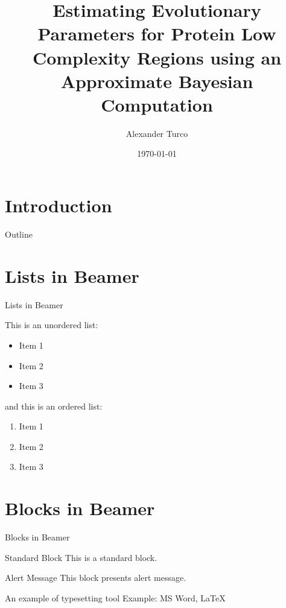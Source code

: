 \documentclass{beamer}
\title[BEAP Dec 2022]{Estimating Evolutionary Parameters for Protein Low Complexity Regions using an Approximate Bayesian Computation}
\author{Alexander Turco}
\date{\today}
\begin{document}
	
	\section{Introduction}
	\begin{frame}
		\titlepage 
	\end{frame}

	
	\logo{}
	
	
	\begin{frame}{Outline}
		\tableofcontents
	\end{frame}
	
	
	\section{Lists in Beamer}
	\begin{frame}{Lists in Beamer}
		
		This is an unordered list:
		\begin{itemize}
			\item Item 1
			\item Item 2
			\item Item 3
		\end{itemize}
		
		and this is an ordered list:
		\begin{enumerate}
			\item Item 1
			\item Item 2
			\item Item 3
		\end{enumerate}
		
	\end{frame}
	
	
	\section{Blocks in Beamer}
	\begin{frame}{Blocks in Beamer}
		\begin{block}{Standard Block}
			This is a standard block.
		\end{block}
		\begin{alertblock}{Alert Message}
			This block presents alert message.
		\end{alertblock}
		\begin{exampleblock}{An example of typesetting tool}
			Example: MS Word, \LaTeX{}
		\end{exampleblock}
	\end{frame} 
	
\end{document}
